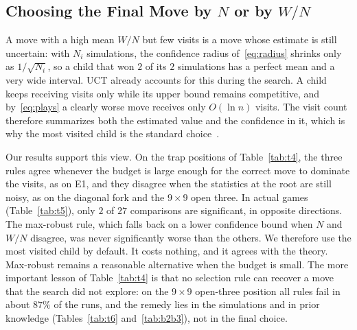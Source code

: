 \subsection{Choosing the Final Move by $N$ or by $W/N$}
\label{subsec:discussion_n_vs_q}

A move with a high mean $W/N$ but few visits is a move whose estimate is still uncertain: with $N_i$ simulations, the confidence radius of~\eqref{eq:radius} shrinks only as $1/\sqrt{N_i}$, so a child that won $2$ of its $2$ simulations has a perfect mean and a very wide interval. UCT already accounts for this during the search. A child keeps receiving visits only while its upper bound remains competitive, and by~\eqref{eq:plays} a clearly worse move receives only $O(\ln n)$ visits. The visit count therefore summarizes both the estimated value and the confidence in it, which is why the most visited child is the standard choice~\cite{browne2012survey}.

Our results support this view. On the trap positions of Table~\ref{tab:t4}, the three rules agree whenever the budget is large enough for the correct move to dominate the visits, as on E1, and they disagree when the statistics at the root are still noisy, as on the diagonal fork and the $9\times 9$ open three. In actual games (Table~\ref{tab:t5}), only $2$ of $27$ comparisons are significant, in opposite directions. The max-robust rule, which falls back on a lower confidence bound when $N$ and $W/N$ disagree, was never significantly worse than the others. We therefore use the most visited child by default. It costs nothing, and it agrees with the theory. Max-robust remains a reasonable alternative when the budget is small. The more important lesson of Table~\ref{tab:t4} is that no selection rule can recover a move that the search did not explore: on the $9\times 9$ open-three position all rules fail in about $87\%$ of the runs, and the remedy lies in the simulations and in prior knowledge (Tables~\ref{tab:t6} and~\ref{tab:b2b3}), not in the final choice.
